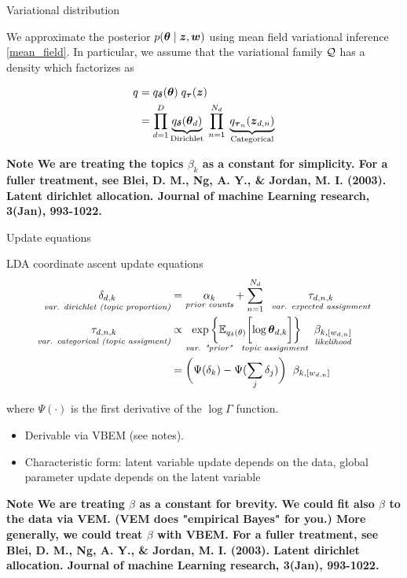 \documentclass[10pt]{beamer}
\begin{document}
\begin{frame}{Variational distribution}

We approximate the posterior $p(\+\theta \cond \+z, \+w)$
using mean field variational inference  \eqref{mean_field}. In particular, we assume that the variational family $\Q$ has a density which factorizes as

\begin{align} 
q &= q_\+\delta (\+\theta) \; q_\+\tau (\+z) \nonumber \\
&=  \ds\prod_{d=1}^D \explaintermbrace{Dirichlet}{q_\+\delta (\+\theta_d)}  \; \ds\prod_{n=1}^{N_d} \; \explaintermbrace{Categorical}{q_{\+\tau_n} (\+z_{d,n})} \label{mean_field_lda}
\end{align}

\vfil \vfill \vfill
\tiny \bf{Note} We are treating the topics $\beta_k$ as a constant for simplicity.   For a fuller treatment, see Blei, D. M., Ng, A. Y., \& Jordan, M. I. (2003). Latent dirichlet allocation. Journal of machine Learning research, 3(Jan), 993-1022.
\end{frame}



\begin{frame}{Update equations} 

\begin{block}{LDA coordinate ascent update equations}
\begin{align} 
\explainterm{var. dirichlet (topic proportion)}{\delta_{d,k}} &= \explainterm{prior counts}{\alpha_k} + \ds\sum_{n=1}^{N_d} \;\; \explainterm{var. expected assignment}{\tau_{d, n,k}} \label{dirichlet_update} \\
\explainterm{var. categorical (topic assigment)}{\tau_{d,n,k}} &\propto   \explainterm{var. "prior" \; topic assignment}{\exp \bigg\{ \biggE{q_\delta(\theta)}{\log \+\theta_{d,k}} \bigg\} } \;\; \explainterm{likelihood}{\beta_{k, [w_{d,n}]}}  \nonumber  \\
 &= \bigg( \Psi(\delta_k) - \Psi (\ds\sum_j \delta_j) \bigg) \;\;  \beta_{k, [w_{d,n}]} 
 \label{multinomial_update} 
\end{align}

where $\Psi(\cdot)$ is the first derivative of the $\log \Gamma$ function. 
\end{block}


\begin{itemize}
\item Derivable via VBEM (see notes). 
\item Characteristic form: latent variable update depends on the data, global parameter update depends on the latent variable
\end{itemize}

\vfil \vfill \vfill
\tiny \bf{Note} We are treating $\beta$ as a constant for brevity.  We could fit also $\beta$ to the data via  VEM.  (VEM does "empirical Bayes" for you.)   More generally, we could treat $\beta$ with VBEM.  For a fuller treatment, see Blei, D. M., Ng, A. Y., \& Jordan, M. I. (2003). Latent dirichlet allocation. Journal of machine Learning research, 3(Jan), 993-1022.
\end{frame}
\end{document}
